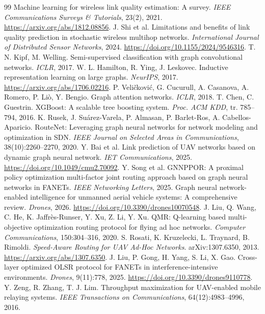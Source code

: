 \documentclass[11pt,a4paper]{article}
\begin{document}
\begin{thebibliography}{99}
Machine learning for wireless link quality estimation: A survey.
\textit{IEEE Communications Surveys \& Tutorials}, 23(2), 2021.
\url{https://arxiv.org/abs/1812.08856}.
 J. Shi et al.
Limitations and benefits of link quality prediction in stochastic wireless
multihop networks. \textit{International Journal of Distributed Sensor
Networks}, 2024. \url{https://doi.org/10.1155/2024/9546316}.
 T. N. Kipf, M. Welling.
Semi-supervised classification with graph convolutional networks.
\textit{ICLR}, 2017.
 W. L. Hamilton, R. Ying, J. Leskovec.
Inductive representation learning on large graphs.
\textit{NeurIPS}, 2017. \url{https://arxiv.org/abs/1706.02216}.
 P. Veličković, G. Cucurull, A. Casanova, A. Romero, P. Liò,
Y. Bengio. Graph attention networks. \textit{ICLR}, 2018.
 T. Chen, C. Guestrin.
XGBoost: A scalable tree boosting system.
\textit{Proc. ACM KDD}, tr. 785--794, 2016.
 K. Rusek, J. Suárez-Varela, P. Almasan, P. Barlet-Ros,
A. Cabellos-Aparicio. RouteNet: Leveraging graph neural networks for network
modeling and optimization in SDN.
\textit{IEEE Journal on Selected Areas in Communications}, 38(10):2260--2270, 2020.
 Y. Bai et al.
Link prediction of UAV networks based on dynamic graph neural network.
\textit{IET Communications}, 2025. \url{https://doi.org/10.1049/cmu2.70092}.
 Y. Song et al.
GNNPPOR: A proximal policy optimization multi-factor joint routing approach
based on graph neural networks in FANETs.
\textit{IEEE Networking Letters}, 2025.
 Graph neural network-enabled intelligence for unmanned
aerial vehicle systems: A comprehensive review.
\textit{Drones}, 2026. \url{https://doi.org/10.3390/drones10070548}.
 J. Liu, Q. Wang, C. He, K. Jaffrès-Runser, Y. Xu, Z. Li, Y. Xu.
QMR: Q-learning based multi-objective optimization routing protocol for flying
ad hoc networks. \textit{Computer Communications}, 150:304--316, 2020.
 S. Rosati, K. Kruzelecki, L. Traynard, B. Rimoldi.
\textit{Speed-Aware Routing for UAV Ad-Hoc Networks}.
arXiv:1307.6350, 2013. \url{https://arxiv.org/abs/1307.6350}.
 J. Liu, P. Gong, H. Yang, S. Li, X. Gao.
Cross-layer optimized OLSR protocol for FANETs in interference-intensive
environments. \textit{Drones}, 9(11):778, 2025.
\url{https://doi.org/10.3390/drones9110778}.
 Y. Zeng, R. Zhang, T. J. Lim.
Throughput maximization for UAV-enabled mobile relaying systems.
\textit{IEEE Transactions on Communications}, 64(12):4983--4996, 2016.

\end{thebibliography}
\end{document}
